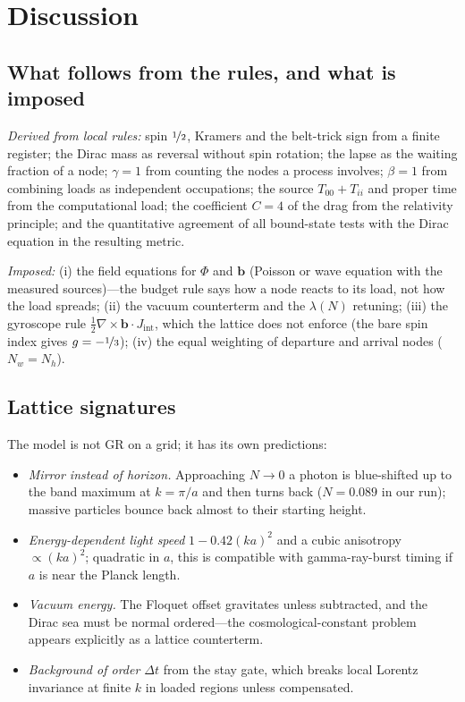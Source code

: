 \documentclass[twocolumn,showpacs,preprintnumbers,amsmath,amssymb]{revtex4-2}
\newcommand{\Jint}{J_{\mathrm{int}}}
\newcommand{\bvec}{\mathbf{b}}
\begin{document}
\section{Discussion}
\label{sec:discussion}

\subsection{What follows from the rules, and what is imposed}

\emph{Derived from local rules:} spin $\nicefrac12$, Kramers and the belt-trick
sign from a finite register; the Dirac mass as reversal without spin rotation;
the lapse as the waiting fraction of a node; $\gamma=1$ from counting the nodes a
process involves; $\beta=1$ from combining loads as independent occupations;
the source $T_{00}+T_{ii}$ and proper time from the computational load; the
coefficient $C=4$ of the drag from the relativity principle; and the
quantitative agreement of all bound-state tests with the Dirac equation in the
resulting metric.

\emph{Imposed:}
(i) the field equations for $\Phi$ and $\bvec$ (Poisson or wave equation with the
measured sources)---the budget rule says how a node reacts to its load, not how
the load spreads;
(ii) the vacuum counterterm and the $\lambda(N)$ retuning;
(iii) the gyroscope rule $\tfrac12\nabla\times\bvec\cdot\Jint$, which the lattice
does not enforce (the bare spin index gives $g=-\nicefrac13$);
(iv) the equal weighting of departure and arrival nodes ($N_w=N_h$).

\subsection{Lattice signatures}

The model is not GR on a grid; it has its own predictions:
\begin{itemize}
\item \emph{Mirror instead of horizon.} Approaching $N\to0$ a photon is
blue-shifted up to the band maximum at $k=\pi/a$ and then turns back
($N=0.089$ in our run); massive particles bounce back almost to their starting
height.
\item \emph{Energy-dependent light speed} $1-0.42(ka)^{2}$ and a cubic
anisotropy $\propto(ka)^{2}$; quadratic in $a$, this is compatible with
gamma-ray-burst timing if $a$ is near the Planck length.
\item \emph{Vacuum energy.} The Floquet offset gravitates unless subtracted, and
the Dirac sea must be normal ordered---the cosmological-constant problem
appears explicitly as a lattice counterterm.
\item \emph{Background of order $\Delta t$} from the stay gate, which breaks
local Lorentz invariance at finite $k$ in loaded regions unless compensated.
\end{itemize}
\end{document}
